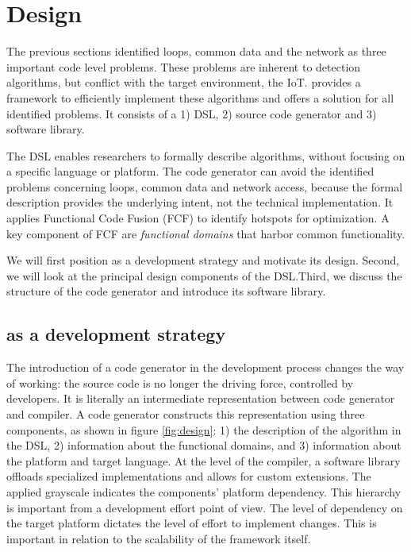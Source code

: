 \documentclass[3p,times,procedia]{elsarticle}
\begin{document}
\section{Design}
\label{design}

The previous sections identified loops, common data and the network as three
important code level problems. These problems are inherent to detection
algorithms, but conflict with the target environment, the IoT\@. \FOO provides
a framework to efficiently implement these algorithms and offers a solution for
all identified problems. It consists of a 1) DSL, 2) source code generator and
3) software library.

The DSL enables researchers to formally describe algorithms, without focusing
on a specific language or platform. The code generator can avoid the identified
problems concerning loops, common data and network access, because the formal
description provides the underlying intent, not the technical implementation.
It applies Functional Code Fusion (FCF) to identify hotspots for optimization.
A key component of FCF are \emph{functional domains} that harbor common
functionality.

We will first position \FOO as a development strategy and motivate its design.
Second, we will look at the principal design components of the DSL.\@ Third, we
discuss the structure of the code generator and introduce its software library.

\subsection{\FOO as a development strategy}
\label{positioning}

The introduction of a code generator in the development process changes the way
of working: the source code is no longer the driving force, controlled by
developers. It is literally an intermediate representation between code
generator and compiler. A code generator constructs this representation using
three components, as shown in figure \ref{fig:design}: 1) the description of
the algorithm in the DSL, 2) information about the functional domains, and 3)
information about the platform and target language. At the level of the
compiler, a software library offloads specialized implementations and allows
for custom extensions. The applied grayscale indicates the components' platform
dependency. This hierarchy is important from a development effort point of
view. The level of dependency on the target platform dictates the level of
effort to implement changes. This is important in relation to the scalability
of the framework itself.
\end{document}
